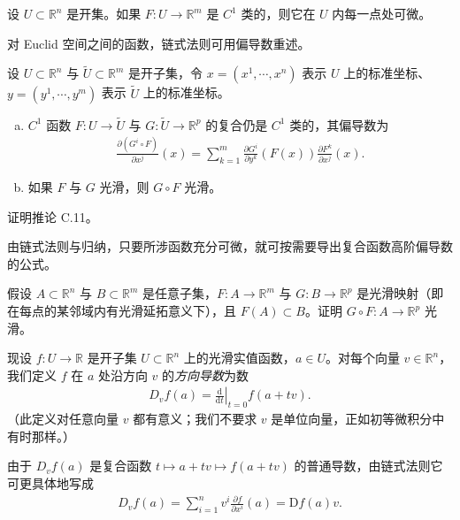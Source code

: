 \documentclass[../../main.tex]{subfiles}
\begin{document}
\begin{proposition}\label{proposition:appC-c1-differentiable}
设 $U\subset\mathbb R^n$ 是开集。如果 $F:U\to\mathbb R^m$ 是 $C^1$ 类的，则它在 $U$ 内每一点处可微。
\end{proposition}

对 Euclid 空间之间的函数，链式法则可用偏导数重述。

\begin{corollary}[偏导数的链式法则]\label{corollary:appC-partial-chain}
设 $U\subset\mathbb R^n$ 与 $\widetilde U\subset\mathbb R^m$ 是开子集，令 $x=(x^1,\cdots ,x^n)$ 表示 $U$ 上的标准坐标、$y=(y^1,\cdots ,y^m)$ 表示 $\widetilde U$ 上的标准坐标。
\begin{enumerate}[(a)]
\item $C^1$ 函数 $F:U\to\widetilde U$ 与 $G:\widetilde U\to\mathbb R^p$ 的复合仍是 $C^1$ 类的，其偏导数为
\begin{align*}
\frac{\partial(G^i\circ F)}{\partial x^j}(x)=\sum_{k=1}^m\frac{\partial G^i}{\partial y^k}(F(x))\frac{\partial F^k}{\partial x^j}(x).
\end{align*}
\item 如果 $F$ 与 $G$ 光滑，则 $G\circ F$ 光滑。
\end{enumerate}
\end{corollary}

\begin{exercise}\label{exercise:appC-C-12}
证明推论 C.11。
\end{exercise}

由链式法则与归纳，只要所涉函数充分可微，就可按需要导出复合函数高阶偏导数的公式。

\begin{exercise}\label{exercise:appC-C-13}
假设 $A\subset\mathbb R^n$ 与 $B\subset\mathbb R^m$ 是任意子集，$F:A\to\mathbb R^m$ 与 $G:B\to\mathbb R^p$ 是光滑映射（即在每点的某邻域内有光滑延拓意义下），且 $F(A)\subset B$。证明 $G\circ F:A\to\mathbb R^p$ 光滑。
\end{exercise}

现设 $f:U\to\mathbb R$ 是开子集 $U\subset\mathbb R^n$ 上的光滑实值函数，$a\in U$。对每个向量 $v\in\mathbb R^n$，我们定义 $f$ 在 $a$ 处沿方向 $v$ 的\emph{方向导数}为数
\begin{align}\label{align:appC-directional}
D_v f(a)=\left.\frac{\mathrm{d}}{\mathrm{d}t}\right|_{t=0}f(a+tv).
\end{align}
（此定义对任意向量 $v$ 都有意义；我们不要求 $v$ 是单位向量，正如初等微积分中有时那样。）

由于 $D_v f(a)$ 是复合函数 $t\mapsto a+tv\mapsto f(a+tv)$ 的普通导数，由链式法则它可更具体地写成
\begin{align*}
D_v f(a)=\sum_{i=1}^n v^i\frac{\partial f}{\partial x^i}(a)=\mathrm{D}f(a)v.
\end{align*}
\end{document}
